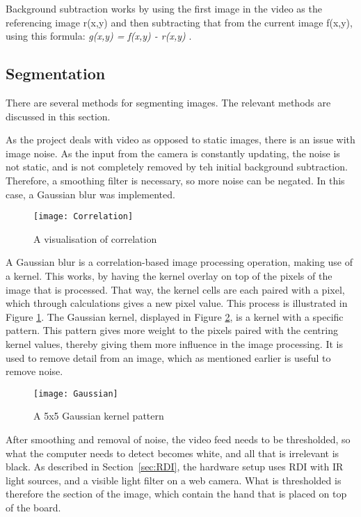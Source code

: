Background subtraction works by using the first image in the video as the referencing image r(x,y) and then subtracting that from the current image f(x,y), using this formula: \textit{g(x,y) = f(x,y) - r(x,y)} \citep{moeslund_introduction_2012}. 

\subsection{Segmentation}
There are several methods for segmenting images. The relevant methods are discussed in this section. 

As the project deals with video as opposed to static images, there is an issue with image noise. As the input from the camera is constantly updating, the noise is not static, and is not completely removed by teh initial background subtraction. Therefore, a smoothing filter is necessary, so more noise can be negated. In this case, a Gaussian blur was implemented.

\begin{figure}[h!]
\centering \texttt{[image: Correlation]}
\caption{A visualisation of correlation \label{Fig:Correlation}\citep{moeslund_introduction_2012}}
\end{figure}

A Gaussian blur is a correlation-based image processing operation, making use of a kernel. This works, by having the kernel overlay on top of the pixels of the image that is processed. That way, the kernel cells are each paired with a pixel, which through calculations gives a new pixel value. This process is illustrated in Figure \ref{Fig:Correlation}. The Gaussian kernel, displayed in Figure \ref{Fig:Gaussian}, is a kernel with a specific pattern. This pattern gives more weight to the pixels paired with the centring kernel values, thereby giving them more influence in the image processing. It is used to remove detail from an image, which as mentioned earlier is useful to remove noise.

\begin{figure}[h!]
\centering \texttt{[image: Gaussian]}
\caption{A 5x5 Gaussian kernel pattern \label{Fig:Gaussian}\citep{moeslund_introduction_2012}}
\end{figure}

After smoothing and removal of noise, the video feed needs to be thresholded, so what the computer needs to detect becomes white, and all that is irrelevant is black. As described in Section~\ref{sec:RDI}, the hardware setup uses RDI with IR light sources, and a visible light filter on a web camera. What is thresholded is therefore the section of the image, which contain the hand that is placed on top of the board.
 
